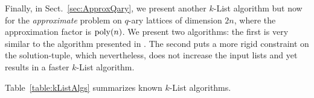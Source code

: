Finally, in Sect.~\ref{sec:ApproxQary}, we present another $k$-List algorithm but now for the 
\emph{approximate} \SVP problem on $q$-ary lattices of dimension $2n$, where the approximation factor is $\mathrm{poly}(n)$. We present two algorithms: the first is very similar to the \BKW algorithm presented in \cite{C:GuoJohSta15, C:KirFou15}. The second puts a more rigid constraint on the solution-tuple, which nevertheless, does not increase the input lists and yet results in a faster $k$-List algorithm. 

Table~\ref{table:kListAlgs} summarizes known $k$-List algorithms. 



\clearpage

\renewcommand{\arraystretch}{1.6}
\begin{table}[h]
\centering
\end{table}
